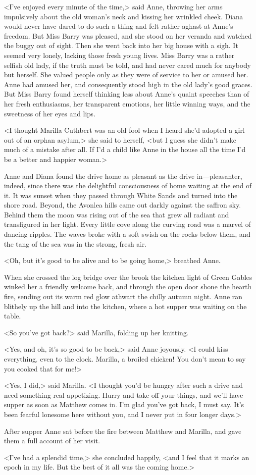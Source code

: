 <I've enjoyed every minute of the time,> said Anne, throwing her arms impulsively about the old woman's neck and kissing her wrinkled cheek. Diana would never have dared to do such a thing and felt rather aghast at Anne's freedom. But Miss Barry was pleased, and she stood on her veranda and watched the buggy out of sight. Then she went back into her big house with a sigh. It seemed very lonely, lacking those fresh young lives. Miss Barry was a rather selfish old lady, if the truth must be told, and had never cared much for anybody but herself. She valued people only as they were of service to her or amused her. Anne had amused her, and consequently stood high in the old lady's good graces. But Miss Barry found herself thinking less about Anne's quaint speeches than of her fresh enthusiasms, her transparent emotions, her little winning ways, and the sweetness of her eyes and lips.

<I thought Marilla Cuthbert was an old fool when I heard she'd adopted a girl out of an orphan asylum,> she said to herself, <but I guess she didn't make much of a mistake after all. If I'd a child like Anne in the house all the time I'd be a better and happier woman.>

Anne and Diana found the drive home as pleasant as the drive in—pleasanter, indeed, since there was the delightful consciousness of home waiting at the end of it. It was sunset when they passed through White Sands and turned into the shore road. Beyond, the Avonlea hills came out darkly against the saffron sky. Behind them the moon was rising out of the sea that grew all radiant and transfigured in her light. Every little cove along the curving road was a marvel of dancing ripples. The waves broke with a soft swish on the rocks below them, and the tang of the sea was in the strong, fresh air.

<Oh, but it's good to be alive and to be going home,> breathed Anne.

When she crossed the log bridge over the brook the kitchen light of Green Gables winked her a friendly welcome back, and through the open door shone the hearth fire, sending out its warm red glow athwart the chilly autumn night. Anne ran blithely up the hill and into the kitchen, where a hot supper was waiting on the table.

<So you've got back?> said Marilla, folding up her knitting.

<Yes, and oh, it's so good to be back,> said Anne joyously. <I could kiss everything, even to the clock. Marilla, a broiled chicken! You don't mean to say you cooked that for me!>

<Yes, I did,> said Marilla. <I thought you'd be hungry after such a drive and need something real appetizing. Hurry and take off your things, and we'll have supper as soon as Matthew comes in. I'm glad you've got back, I must say. It's been fearful lonesome here without you, and I never put in four longer days.>

After supper Anne sat before the fire between Matthew and Marilla, and gave them a full account of her visit.

<I've had a splendid time,> she concluded happily, <and I feel that it marks an epoch in my life. But the best of it all was the coming home.>